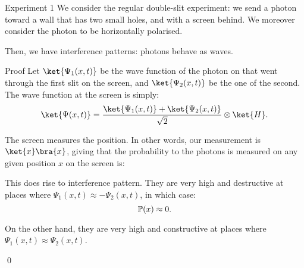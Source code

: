\documentclass[a4paper]{article}
\begin{document}
\begin{parag}{Experiment 1}
    We consider the regular double-slit experiment: we send a photon toward a wall that has two small holes, and with a screen behind. We moreover consider the photon to be horizontally polarised.

    Then, we have interference patterns: photons behave as waves.


    \begin{subparag}{Proof}
        Let $\ket{\Psi_1\left(x, t\right)}$ be the wave function of the photon on that went through the first slit on the screen, and $\ket{\Psi_2\left(x, t\right)}$ be the one of the second. The wave function at the screen is simply: 
        \[\ket{\Psi\left(x, t\right)} = \frac{\ket{\Psi_1\left(x, t\right)} + \ket{\Psi_2\left(x, t\right)}}{\sqrt{2}} \otimes \ket{H}.\]
        
        The screen measures the position. In other words, our measurement is $\ket{x}\bra{x}$, giving that the probability to the photons is measured on any given position $x$ on the screen is:
        
        This does rise to interference pattern. They are very high and destructive at places where $\Psi_1\left(x, t\right) \approx - \Psi_2\left(x, t\right)$, in which case: 
        \[\prob\left(x\right) \approx 0.\]

        On the other hand, they are very high and constructive at places where $\Psi_1\left(x, t\right) \approx \Psi_2\left(x, t\right)$.

        \qed
    \end{subparag}
\end{parag}
\end{document}
